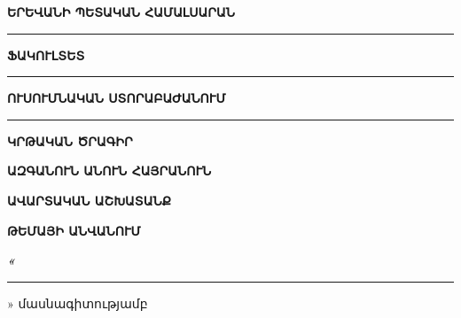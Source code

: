 \documentclass[12pt,a4paper]{report}
\begin{document}

\begin{titlepage}
\thispagestyle{empty}

\begin{center}

\vspace*{1.4cm}

{\fontsize{16pt}{19pt}\selectfont\bfseries ԵՐԵՎԱՆԻ ՊԵՏԱԿԱՆ ՀԱՄԱԼՍԱՐԱՆ}

\vspace{1.0cm}

\begin{minipage}{0.9\textwidth}
\centering
\rule{7.8cm}{0.4pt}
{\fontsize{14pt}{17pt}\selectfont\bfseries ՖԱԿՈՒԼՏԵՏ}
\end{minipage}

\vspace{0.85cm}

\begin{minipage}{0.9\textwidth}
\centering
\rule{4.0cm}{0.4pt}
{\fontsize{14pt}{17pt}\selectfont\bfseries ՈՒՍՈՒՄՆԱԿԱՆ ՍՏՈՐԱԲԱԺԱՆՈՒՄ}
\end{minipage}

\vspace{0.85cm}

\begin{minipage}{0.9\textwidth}
\centering
\rule{6.0cm}{0.4pt}
{\fontsize{14pt}{17pt}\selectfont\bfseries ԿՐԹԱԿԱՆ ԾՐԱԳԻՐ}
\end{minipage}

\vspace{1.7cm}

{\fontsize{18pt}{22pt}\selectfont\bfseries ԱԶԳԱՆՈՒՆ ԱՆՈՒՆ ՀԱՅՐԱՆՈՒՆ}

\vspace{1.15cm}

{\fontsize{30pt}{36pt}\selectfont\bfseries ԱՎԱՐՏԱԿԱՆ ԱՇԽԱՏԱՆՔ}

\vspace{1.05cm}

{\fontsize{18pt}{22pt}\selectfont\bfseries ԹԵՄԱՅԻ ԱՆՎԱՆՈՒՄ}

\vspace{1.0cm}

\begin{minipage}{0.9\textwidth}
\centering
{\fontsize{14pt}{18pt}\selectfont\bfseries\itshape
«\rule{8.0cm}{0.4pt}» մասնագիտությամբ
}
\end{minipage}

\vspace{0.2cm}


\end{center}
\end{titlepage}
\end{document}
